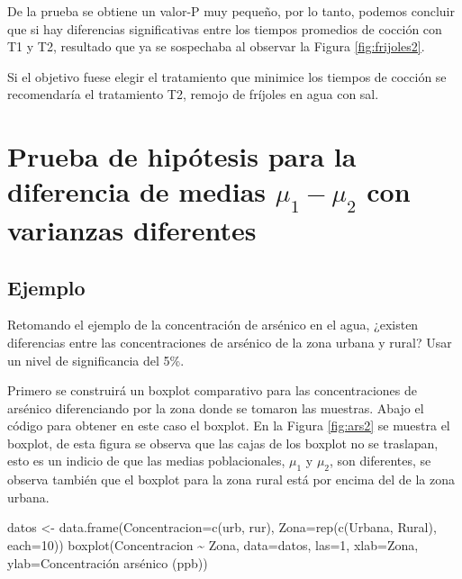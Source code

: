 \documentclass[
]{book}
\makeatletter
\newenvironment{Shaded}{\begin{snugshade}}{\end{snugshade}}
\newcommand{\AttributeTok}[1]{\textcolor[rgb]{0.77,0.63,0.00}{#1}}
\newcommand{\DecValTok}[1]{\textcolor[rgb]{0.00,0.00,0.81}{#1}}
\newcommand{\FunctionTok}[1]{\textcolor[rgb]{0.00,0.00,0.00}{#1}}
\newcommand{\NormalTok}[1]{#1}
\newcommand{\OtherTok}[1]{\textcolor[rgb]{0.56,0.35,0.01}{#1}}
\newcommand{\SpecialCharTok}[1]{\textcolor[rgb]{0.00,0.00,0.00}{#1}}
\newcommand{\StringTok}[1]{\textcolor[rgb]{0.31,0.60,0.02}{#1}}
\newenvironment{kframe}{%
\medskip{}
\setlength{\fboxsep}{.8em}
 \def\at@end@of@kframe{}%
 \ifinner\ifhmode%
  \def\at@end@of@kframe{\end{minipage}}%
  \begin{minipage}{\columnwidth}%
 \fi\fi%
 \def\FrameCommand##1{\hskip\@totalleftmargin \hskip-\fboxsep
 \colorbox{shadecolor}{##1}\hskip-\fboxsep
     \hskip-\linewidth \hskip-\@totalleftmargin \hskip\columnwidth}%
 \MakeFramed {\advance\hsize-\width
   \@totalleftmargin\z@ \linewidth\hsize
   \@setminipage}}%
 {\par\unskip\endMakeFramed%
 \at@end@of@kframe}
\renewenvironment{Shaded}{\begin{kframe}}{\end{kframe}}
\makeatother
\begin{document}
De la prueba se obtiene un valor-P muy pequeño, por lo tanto, podemos concluir que si hay diferencias significativas entre los tiempos promedios de cocción con T1 y T2, resultado que ya se sospechaba al observar la Figura \ref{fig:frijoles2}.

Si el objetivo fuese elegir el tratamiento que minimice los tiempos de cocción se recomendaría el tratamiento T2, remojo de fríjoles en agua con sal.

\hypertarget{prueba-de-hipuxf3tesis-para-la-diferencia-de-medias-mu_1-mu_2-con-varianzas-diferentes}{%
\section{\texorpdfstring{Prueba de hipótesis para la diferencia de medias \(\mu_1-\mu_2\) con varianzas diferentes}{Prueba de hipótesis para la diferencia de medias \textbackslash mu\_1-\textbackslash mu\_2 con varianzas diferentes}}\label{prueba-de-hipuxf3tesis-para-la-diferencia-de-medias-mu_1-mu_2-con-varianzas-diferentes}}

\hypertarget{ejemplo-72}{%
\subsection*{Ejemplo}\label{ejemplo-72}}

Retomando el ejemplo de la concentración de arsénico en el agua, ¿existen diferencias entre las concentraciones de arsénico de la zona urbana y rural? Usar un nivel de significancia del 5\%.

Primero se construirá un boxplot comparativo para las concentraciones de arsénico diferenciando por la zona donde se tomaron las muestras. Abajo el código para obtener en este caso el boxplot. En la Figura \ref{fig:ars2} se muestra el boxplot, de esta figura se observa que las cajas de los boxplot no se traslapan, esto es un indicio de que las medias poblacionales, \(\mu_1\) y \(\mu_2\), son diferentes, se observa también que el boxplot para la zona rural está por encima del de la zona urbana.

\begin{Shaded}
\begin{Highlighting}[]
\NormalTok{datos }\OtherTok{\textless{}{-}} \FunctionTok{data.frame}\NormalTok{(}\AttributeTok{Concentracion=}\FunctionTok{c}\NormalTok{(urb, rur),}
                    \AttributeTok{Zona=}\FunctionTok{rep}\NormalTok{(}\FunctionTok{c}\NormalTok{(}\StringTok{\textquotesingle{}Urbana\textquotesingle{}}\NormalTok{, }\StringTok{\textquotesingle{}Rural\textquotesingle{}}\NormalTok{), }\AttributeTok{each=}\DecValTok{10}\NormalTok{))}
\FunctionTok{boxplot}\NormalTok{(Concentracion }\SpecialCharTok{\textasciitilde{}}\NormalTok{ Zona, }\AttributeTok{data=}\NormalTok{datos, }\AttributeTok{las=}\DecValTok{1}\NormalTok{,}
        \AttributeTok{xlab=}\StringTok{\textquotesingle{}Zona\textquotesingle{}}\NormalTok{, }\AttributeTok{ylab=}\StringTok{\textquotesingle{}Concentración arsénico (ppb)\textquotesingle{}}\NormalTok{)}
\end{Highlighting}
\end{Shaded}
\end{document}
